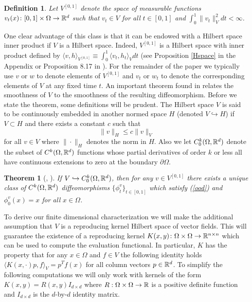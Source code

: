 \documentclass[noinfoline]{imsart}
\newtheorem{theorem}{Theorem}
\newtheorem{definition}{Definition}
\begin{document}
\begin{definition}
\label{defV01}
 Let  $V^{[0,1]}$ denote the space of measurable functions $v_t(x)\colon [0,1]\times \Omega\rightarrow \Bbb R^d$ such that $v_t\in V$ for all $t\in [0,1]$ and $\int_0^1 \| v_t\|^2_V dt <\infty $.
\end{definition}
One clear advantage of this class  is that it can be endowed with a Hilbert space inner product if $V$ is a Hilbert space. Indeed,
 $V^{[0,1]}$ is a Hilbert space with inner product  defined by $\langle v,h \rangle_{V^{[0,1]}} \equiv\int_0^1 \langle  v_t, h_t\rangle_V dt$ (see Proposition \ref{Hspace} in the Appendix or Proposition 8.17 in \cite{you:10}).
For the remainder of the paper we typically use $v$ or $w$ to denote  elements of  $ V^{[0,1]}$ and  $v_t$ or $w_t$ to denote the corresponding elements of $V$ at any fixed time $t$.
An important theorem found in \cite{you:10} relates the smoothness of $V$ to the smoothness of the resulting diffeomorphism.
Before we state the theorem, some definitions will be prudent. The Hilbert space $V$ is said to be continuously embedded in another normed space $H$ (denoted $V\hookrightarrow H$) if $V\subset H$ and there exists a constant $c$ such that
\[ \| v \|_H \leq c \| v\|_V \]
for all $v\in V$ where $\|\cdot \|_H$ denotes the norm in $H$.
 Also we let $C_0^k(\Omega,\Bbb R^d)$ denote the subset of $C^k(\Omega,\Bbb R^d)$ functions whose partial derivatives of order $k$ or less all have continuous extensions to zero at the boundary $\partial \Omega$.
\begin{theorem}[\cite{you:10}, \cite{dup:98}]
\label{ExistFlow}
If $V\hookrightarrow C_0^k(\Omega,\Bbb R^d)$, then for any $v\in V^{[0,1]}$ there exists a unique class of $C^k(\Omega,\Bbb R^d)$ diffeomorphisms $\{\phi^v_t\}_{t\in[0,1]}$ which satisfy (\ref{ood}) and  $\phi_0^v(x) = x$ for all $x\in \Omega$.
\end{theorem}

To derive our finite dimensional characterization we will make the additional assumption that $V$ is a reproducing kernel Hilbert space of vector fields. This will guarantee the existence of a reproducing kernel
 $K( x,y)\colon \Omega \times \Omega \rightarrow \Bbb R^{n\times n}$ which can be used to compute the evaluation functional. In particular, $K$ has the property that for any $x\in \Omega$ and $f\in V$ the following identity holds $\langle  K(x,\cdot) p , f\rangle _V=  p^T f(x)$ for all column vectors $p\in \Bbb R^d$.
 To simplify the following computations we will only work with kernels of the form $K(x,y) = R(x,y)I_{d\times d}$ where $R:\Omega\times\Omega\rightarrow \Bbb R$ is a positive definite function and $I_{d\times d}$ is the $d$-by-$d$ identity matrix.
\end{document}
